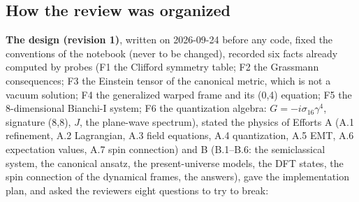 \subsection{How the review was organized}
\label{sec:5.1}

\textbf{The design (revision 1)}, written on 2026-09-24 before any code, fixed the conventions of the notebook (never to be changed), recorded six facts already computed by probes (F1 the Clifford symmetry table; F2 the Grassmann consequences; F3 the Einstein tensor of the canonical metric, which is not a vacuum solution; F4 the generalized warped frame and its (0,4) equation; F5 the 8-dimensional Bianchi-I system; F6 the quantization algebra: $G = -i \sigma_{16} \gamma^{4}$, signature (8,8), $J$, the plane-wave spectrum), stated the physics of Efforts A (A.1 refinement, A.2 Lagrangian, A.3 field equations, A.4 quantization, A.5 EMT, A.6 expectation values, A.7 spin connection) and B (B.1--B.6: the semiclassical system, the canonical ansatz, the present-universe models, the DFT states, the spin connection of the dynamical frames, the answers), gave the implementation plan, and asked the reviewers eight questions to try to break:

